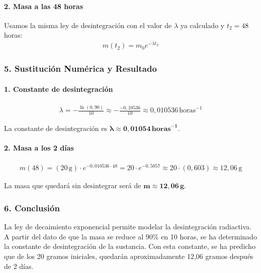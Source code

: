 \paragraph{2. Masa a las 48 horas}
Usamos la misma ley de desintegración con el valor de $\lambda$ ya calculado y $t_2=48$ horas:
\begin{gather}
    m(t_2) = m_0 e^{-\lambda t_2}
\end{gather}

\subsubsection*{5. Sustitución Numérica y Resultado}
\paragraph{1. Constante de desintegración}
\begin{gather}
    \lambda = -\frac{\ln(0,90)}{10} \approx -\frac{-0,10536}{10} \approx 0,010536 \, \text{horas}^{-1}
\end{gather}
\begin{cajaresultado}
La constante de desintegración es $\boldsymbol{\lambda \approx 0,01054 \, \textbf{horas}^{-1}}$.
\end{cajaresultado}

\paragraph{2. Masa a los 2 días}
\begin{gather}
    m(48) = (20 \, \text{g}) \cdot e^{-0,010536 \cdot 48} = 20 \cdot e^{-0,5057} \approx 20 \cdot (0,603) \approx 12,06 \, \text{g}
\end{gather}
\begin{cajaresultado}
La masa que quedará sin desintegrar será de $\boldsymbol{m \approx 12,06 \, \textbf{g}}$.
\end{cajaresultado}

\subsubsection*{6. Conclusión}
\begin{cajaconclusion}
La ley de decaimiento exponencial permite modelar la desintegración radiactiva. A partir del dato de que la masa se reduce al 90\% en 10 horas, se ha determinado la constante de desintegración de la sustancia. Con esta constante, se ha predicho que de los 20 gramos iniciales, quedarán aproximadamente 12,06 gramos después de 2 días.
\end{cajaconclusion}

